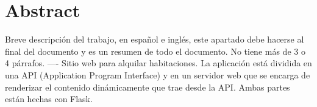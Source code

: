 \section{Abstract}

Breve descripción del trabajo, en español e inglés, este apartado debe hacerse al final del documento y es un resumen de todo el documento. No tiene más de 3 o 4 párrafos.
—-
Sitio web para alquilar habitaciones. La aplicación está dividida en una API (Application Program Interface) y en un servidor web que se encarga de renderizar el contenido dinámicamente que trae desde la API. Ambas partes están hechas con Flask.
